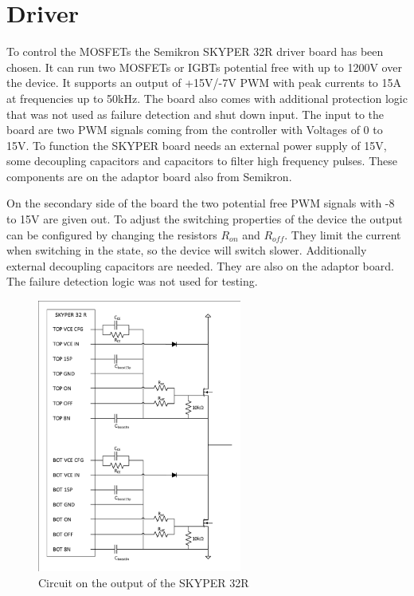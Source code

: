 \section{Driver}\label{sec:driver}

To control the MOSFETs the Semikron SKYPER 32R driver board has been chosen.
It can run two MOSFETs or IGBTs potential free with up to 1200V over the device.
It supports an output of +15V/-7V PWM with peak currents to 15A at frequencies up to 50kHz.
The board also comes with additional protection logic that was not used as failure detection and shut down input.
The input to the board are two PWM signals coming from the controller with Voltages of 0 to 15V.
To function the SKYPER board needs an external power supply of 15V,
some decoupling capacitors and capacitors to filter high frequency pulses.
These components are on the adaptor board also from Semikron.


On the secondary side of the board the two potential free PWM signals with -8 to 15V are given out.
To adjust the switching properties of the device the output can be configured by changing the resistors $R_{on}$ and $R_{off}$.
They limit the current when switching in the state, so the device will switch slower.
Additionally external decoupling capacitors are needed. They are also on the adaptor board.
The failure detection logic was not used for testing.

\begin{figure}[H]
   \centering
   \includegraphics[width=0.6\textwidth]{figures/Skyperboard/Skyper32out.pdf}
    \caption{Circuit on the output of the SKYPER 32R}
	\label{fig:Skyper32out}
\end{figure}


